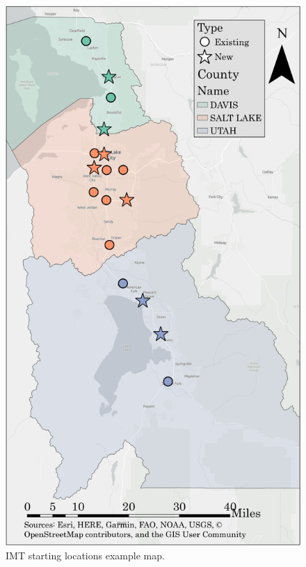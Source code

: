 \documentclass[fancy, oneside, mastersfancy, ms]{byuthesis}
\begin{document}
\begin{figure}

{\centering \includegraphics{figures/imt_gray_map.png}

}

\caption{\label{fig-IMT_Map}IMT starting locations example map.}

\end{figure}
\end{document}
